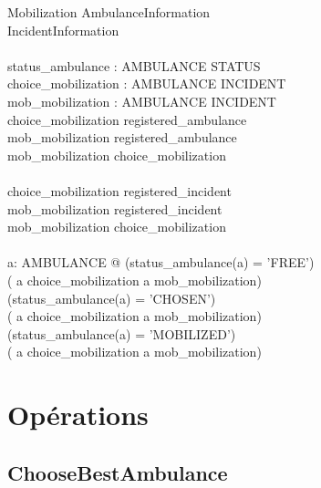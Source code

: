 \documentclass[12pt]{article}
\begin{document}
\begin{schema}{Mobilization}
	AmbulanceInformation \\
	IncidentInformation \\
	\newline \\
	status\_ambulance : AMBULANCE \pfun STATUS \\
	choice\_mobilization : AMBULANCE \pinj INCIDENT \\
	mob\_mobilization : AMBULANCE \pinj INCIDENT \\
  \where
  	\dom choice\_mobilization \subseteq registered\_ambulance \\
	\dom mob\_mobilization \subseteq registered\_ambulance \\
	\dom mob\_mobilization  \subseteq \dom choice\_mobilization \\
	\newline \\
	\ran choice\_mobilization \subseteq registered\_incident \\
	\ran mob\_mobilization \subseteq registered\_incident \\
	\ran mob\_mobilization  \subseteq \ran choice\_mobilization \\
	\newline \\
	\forall a: AMBULANCE @ 
			(status\_ambulance(a) = 'FREE') \equiv \\
	                        ( a \notin \dom choice\_mobilization \land a \notin \dom mob\_mobilization) \\
	                   \land
	                   (status\_ambulance(a) = 'CHOSEN') \equiv \\
	                        ( a \in \dom choice\_mobilization \land a \notin \dom mob\_mobilization) \\
	                     \land
	                   (status\_ambulance(a) = 'MOBILIZED') \equiv \\
	                        ( a \in \dom choice\_mobilization \land a \in \dom mob\_mobilization) \\
  	
\end{schema}

\section{Opérations}

\subsection{ChooseBestAmbulance}
\end{document}
